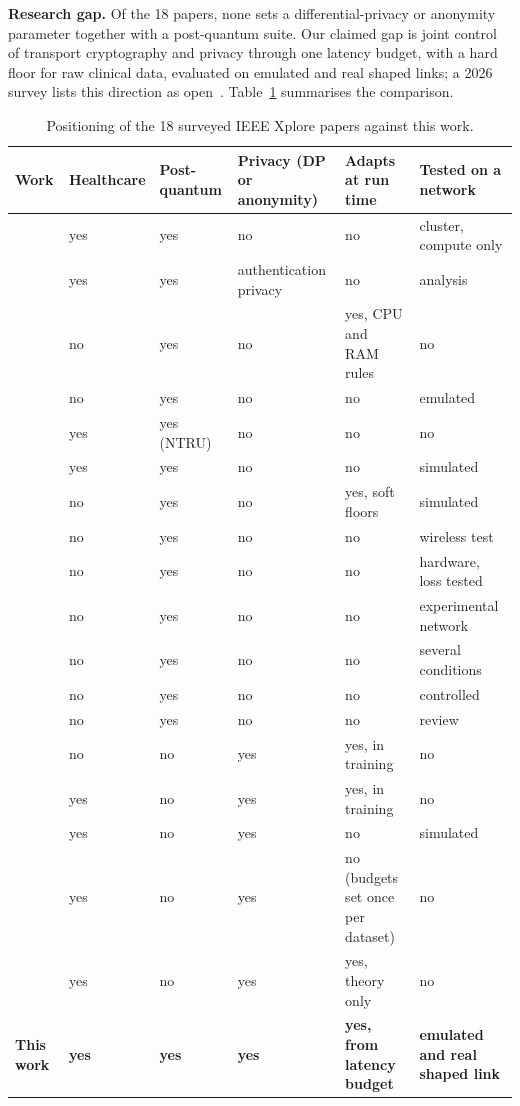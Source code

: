 \documentclass[10pt,twocolumn]{article}
\begin{document}
\textbf{Research gap.} Of the 18 papers, none sets a differential-privacy or anonymity parameter together with a post-quantum suite. Our claimed gap is joint control of transport cryptography and privacy through one latency budget, with a hard floor for raw clinical data, evaluated on emulated and real shaped links; a 2026 survey lists this direction as open~\cite{zaman}. Table~\ref{tab:gap} summarises the comparison.

\begin{table}[t]\centering\small
\caption{Positioning of the 18 surveyed IEEE Xplore papers against this work.}\label{tab:gap}
\begin{tabular}{llllll}\toprule
Work & Healthcare & Post-quantum & Privacy (DP or anonymity) & Adapts at run time & Tested on a network\\\midrule
\cite{ieee04_elhadedy2024} & yes & yes & no & no & cluster, compute only\\
\cite{ieee05_yadav2023} & yes & yes & authentication privacy & no & analysis\\
\cite{ieee06_sinaga2025} & no & yes & no & yes, CPU and RAM rules & no\\
\cite{ieee07_santos2026} & no & yes & no & no & emulated\\
\cite{ieee08_karthikeyan2023} & yes & yes (NTRU) & no & no & no\\
\cite{ieee09_zhukabayeva2024} & yes & yes & no & no & simulated\\
\cite{ieee10_aydeger2026} & no & yes & no & yes, soft floors & simulated\\
\cite{ieee11_ojetunde2025} & no & yes & no & no & wireless test\\
\cite{ieee12_lokesh2025} & no & yes & no & no & hardware, loss tested\\
\cite{ieee13_rubiogarcia2023} & no & yes & no & no & experimental network\\
\cite{ieee14_catoni2025} & no & yes & no & no & several conditions\\
\cite{ieee15_rigon2025} & no & yes & no & no & controlled\\
\cite{ieee16_reazaei2026} & no & yes & no & no & review\\
\cite{ieee17_he2024} & no & no & yes & yes, in training & no\\
\cite{ieee18_yu2024} & yes & no & yes & yes, in training & no\\
\cite{ieee19_zhang2023} & yes & no & yes & no & simulated\\
\cite{ieee20_lyu2025} & yes & no & yes & no (budgets set once per dataset) & no\\
\cite{ieee21_birajdar2025} & yes & no & yes & yes, theory only & no\\
\midrule
\textbf{This work} & \textbf{yes} & \textbf{yes} & \textbf{yes} & \textbf{yes, from latency budget} & \textbf{emulated and real shaped link}\\\bottomrule
\end{tabular}\end{table}
\end{document}
